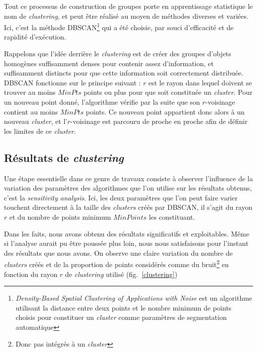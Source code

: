 \documentclass[11pt, a4paper]{article}
\begin{document}
Tout ce processus de construction de groupes porte en apprentissage statistique le nom de \textit{clustering}, et peut être réalisé au moyen de méthodes diverses et variées. Ici, c'est la méthode DBSCAN\footnote{\textit{Density-Based Spatial Clustering of Applications with Noise} est un algorithme utilisant la distance entre deux points et le nombre minimum de points choisis pour constituer un \textit{cluster} comme paramètres de segmentation automatique} qui a été choisie, par souci d'efficacité et de rapidité d'exécution.

Rappelons que l'idée derrière le \textit{clustering} est de créer des groupes d'objets homogènes suffisamment denses pour contenir assez d'information, et suffisamment distincts pour que cette information soit correctement distribuée. DBSCAN fonctionne sur le principe suivant : $r$ est le rayon dans lequel doivent se trouver au moins $MinPts$ points ou plus pour que soit constituée un \textit{cluster}. Pour un nouveau point donné, l'algorithme vérifie par la suite que son $r$-voisinage contient au moins $MinPts$ points. Ce nouveau point appartient donc alors à un nouveau \textit{cluster}, et l'$r$-voisinage est parcouru de proche en proche afin de définir les limites de ce \textit{cluster}.

\subsection{Résultats de \textit{clustering}}

Une étape essentielle dans ce genre de travaux consiste à observer l'influence de la variation des paramètres des algorithmes que l'on utilise sur les résultats obtenus, c'est la \textit{sensitivity analysis}. Ici, les deux paramètres que l'on peut faire varier touchent directement à la taille des \textit{clusters} créés par DBSCAN, il s'agit du rayon $r$ et du nombre de points minimum $MinPoints$ les constituant.

Dans les faits, nous avons obtenu des résultats significatifs et exploitables. Même si l'analyse aurait pu être poussée plus loin, nous nous satisfaisons pour l'instant des résultats que nous avons. On observe une claire variation du nombre de \textit{clusters} créés et de la proportion de points considérés comme du bruit\footnote{Donc pas intégrés à un \textit{cluster}} en fonction du rayon $r$ de \textit{clustering} utilisé (fig.~\ref{clustering})
\end{document}
